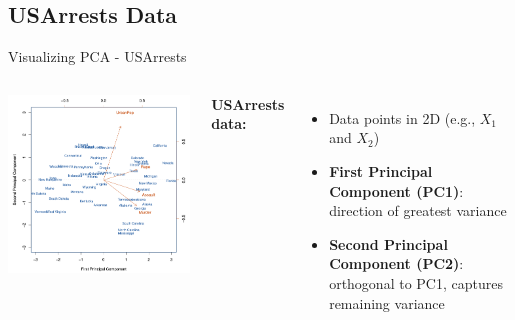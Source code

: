 \documentclass[aspectratio=169,xcolor=dvipsnames]{beamer}
\begin{document}
\subsection{USArrests Data}
\begin{frame}{Visualizing PCA - USArrests}
  \begin{columns}
    \includegraphics[width=\linewidth]{images/figure12_1.png} %

    \textbf{USArrests data:}
    \begin{itemize}
      \item Data points in 2D (e.g., $X_1$ and $X_2$)
      \item \textbf{First Principal Component (PC1)}: direction of greatest variance
      \item \textbf{Second Principal Component (PC2)}: orthogonal to PC1, captures remaining variance
    \end{itemize}

    \vspace{0.3cm}
  \end{columns}
\end{frame}
\end{document}
